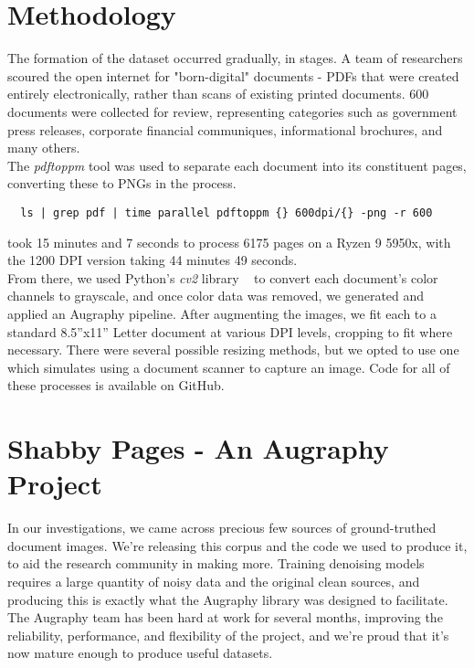 \documentclass[runningheads]{llncs}
\begin{document}
\section{Methodology}
The formation of the dataset occurred gradually, in stages. A team of researchers scoured the open internet for "born-digital" documents - PDFs that were created entirely electronically, rather than scans of existing printed documents. 600 documents were collected for review, representing categories such as government press releases, corporate financial communiques, informational brochures, and many others.\\

The \textit{pdftoppm} tool was used to separate each document into its constituent pages, converting these to PNGs in the process.

\begin{lstlisting}
  ls | grep pdf | time parallel pdftoppm {} 600dpi/{} -png -r 600
\end{lstlisting}

took 15 minutes and 7 seconds to process 6175 pages on a Ryzen 9 5950x, with the 1200 DPI version taking 44 minutes 49 seconds.\\

From there, we used Python's \textit{cv2} library ~\cite{ref_url4} to convert each document's color channels to grayscale, and once color data was removed, we generated and applied an Augraphy pipeline. After augmenting the images, we fit each to a standard 8.5''x11'' Letter document at various DPI levels, cropping to fit where necessary. There were several possible resizing methods, but we opted to use one which simulates using a document scanner to capture an image. Code for all of these processes is available on GitHub.

\section{Shabby Pages - An Augraphy Project}
In our investigations, we came across precious few sources of ground-truthed document images. We're releasing this corpus and the code we used to produce it, to aid the research community in making more. Training denoising models requires a large quantity of noisy data and the original clean sources, and producing this is exactly what the Augraphy library was designed to facilitate. The Augraphy team has been hard at work for several months, improving the reliability, performance, and flexibility of the project, and we're proud that it's now mature enough to produce useful datasets.\\
\end{document}
